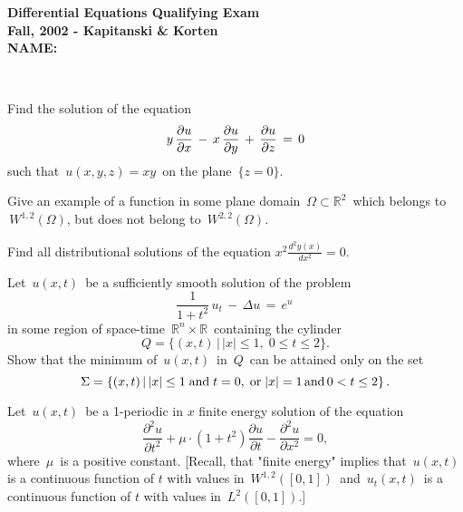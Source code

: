 \documentclass[12pt]{article}
\def\ds{\displaystyle}
\begin{document}
\begin{large}

\begin{center}
{\bf  Differential Equations Qualifying Exam}\\
{\bf Fall, 2002 - Kapitanski \& Korten}\\
{\bf NAME:}
\end{center}
\noindent\hrulefill\\

\vspace{-.2in}
\begin{description}

\vspace{.1in}\item[1.]
Find the solution of the equation 
$$
y\,{\partial u\over\partial x}\,-\,x\,{\partial u\over\partial y}\,+\,
{\partial u\over\partial z}\,=\,0
$$
such that $\,u(x,y,z)=xy\,$ on the plane $\,\{z=0\}$.

\vspace{.1in}\item[2.] Give an example of a function in some 
plane domain $\,\Omega\subset \mathbb R^2\,$ which belongs to  
$\,W^{1,2}(\Omega)$, but does not belong to $\,W^{2,2}(\Omega)$.


\vspace{0.2in}
\vspace{.1in}\item[3.]
Find all distributional solutions of the equation
$\ds x^2\frac{d^2y(x)}{dx^2}=0$.

\vspace{.1in}\item[4.]
Let $\,u(x, t)\,$ be a sufficiently smooth solution 
of the problem
$$
\frac{1}{1+t^2}\,u_t\,-\,\Delta u\,=\,e^u\,
$$ 
in some region of space-time $\,\mathbb R^n\times \mathbb R\,$ 
containing the cylinder 
$$ 
Q=\{(x,t)\,|\,|x|\le 1,\;0\le t \le 2\}.
$$
Show that the minimum of $\,u(x,t)\,$ in $\,Q\,$ can be attained 
only on the set
$$
\Sigma = \{(x, t)\,|\,|x|\le 1 \;\hbox{and}\;t=0, \;\hbox{or}\;
|x|=1\,\hbox{and}\,0<t\le 2\}\,.
$$

\vspace{.1in}\item[5.]
Let $\,u(x,t)\,$ be a 1-periodic in $x$ finite energy solution 
of the equation
$$
  \frac{\partial^2 u}{\partial t^2} 
+\mu\cdot(1+t^2) \frac{\partial u}{\partial t}
- \frac{\partial^2 u}{\partial x^2}= 0,
$$
where $\,\mu\,$ is a positive constant. 
[Recall, that "finite energy" implies that 
$\,u(x,t)\,$ is a continuous function of $t$ with values in 
$\,W^{1,2}([0,1])\,$ and  
$\,u_t(x,t)\,$ is a continuous function of $t$ with values in 
$\,L^{2}([0,1])$.]


\end{description}
\end{large}
\end{document}
